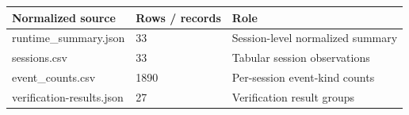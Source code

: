 \begin{tabularx}{\linewidth}{@{}XXX@{}}
\toprule
Normalized source & Rows / records & Role \\
\midrule
runtime\_summary.json & 33 & Session-level normalized summary \\
sessions.csv & 33 & Tabular session observations \\
event\_counts.csv & 1890 & Per-session event-kind counts \\
verification-results.json & 27 & Verification result groups \\
\bottomrule
\end{tabularx}
